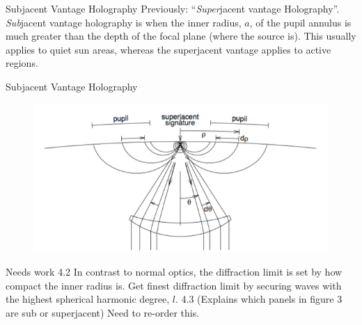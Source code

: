 \documentclass{beamer}
\begin{document}
\begin{frame}{Subjacent Vantage Holography}
    Previously: ``\emph{Super}jacent vantage Holography''.
    \emph{Sub}jacent vantage holography is when the inner radius, $a$,
    of the pupil annulus is much greater than the depth of the focal plane
    (where the source is). This usually applies to quiet sun areas, whereas
    the superjacent vantage applies to active regions.
\end{frame}

\begin{frame}{Subjacent Vantage Holography}
    \begin{figure}
        \includegraphics[width=\textwidth]{fig_4.png}
    \end{figure}
\end{frame}

\begin{frame}{Needs work}
    4.2 In contrast to normal optics, the diffraction limit is set by how
    compact the inner radius is. Get finest diffraction limit by
    securing waves with the highest spherical harmonic degree,
    $l$.
    4.3 (Explains which panels in figure 3 are sub or superjacent)
    Need to re-order this.
\end{frame}
\end{document}
